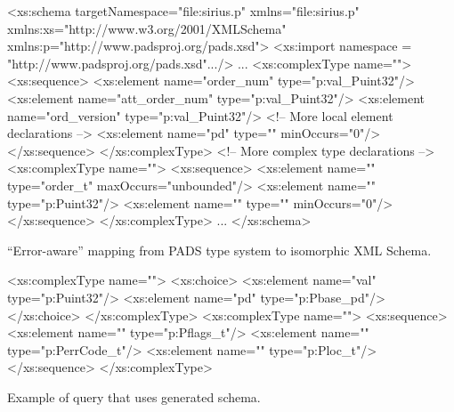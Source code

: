 \documentclass{sigplanconf}
\newcommand{\dibbler}{Sirius}
\begin{document}
\begin{figure*}
\begin{small}
\begin{code}
<xs:schema targetNamespace="file:sirius.p"
           xmlns="file:sirius.p"
           xmlns:xs="http://www.w3.org/2001/XMLSchema"
           xmlns:p="http://www.padsproj.org/pads.xsd">
<xs:import namespace = "http://www.padsproj.org/pads.xsd".../>
...
<xs:complexType name="">
 <xs:sequence>
  <xs:element name="order_num" type="p:val_Puint32"/>
  <xs:element name="att_order_num" type="p:val_Puint32"/>
  <xs:element name="ord_version" type="p:val_Puint32"/>
  <!-- More local element declarations -->
  <xs:element name="pd" type="" minOccurs="0"/>
 </xs:sequence>
</xs:complexType>
<!-- More complex type declarations -->
<xs:complexType name="">
 <xs:sequence>
  <xs:element name="" type="order_t" maxOccurs="unbounded"/>
  <xs:element name="" type="p:Puint32"/>
  <xs:element name="" type="" minOccurs="0"/>
 </xs:sequence>
</xs:complexType>
...
</xs:schema>
\end{code}
\end{small}
\caption{Fragment of XML Schema for \dibbler{} \pads{} description.}
\label{figure:dibbler-schema}
\end{figure*}

``Error-aware'' mapping from PADS type system to isomorphic XML
Schema. 
\begin{small}
\begin{code}
<xs:complexType name="">
  <xs:choice>
   <xs:element name="val" type="p:Puint32"/>
   <xs:element name="pd" type="p:Pbase_pd"/>
  </xs:choice>
</xs:complexType>
<xs:complexType name="">
 <xs:sequence>
   <xs:element name=""  type="p:Pflags_t"/>
   <xs:element name="" type="p:PerrCode_t"/>
   <xs:element name=""     type="p:Ploc_t"/>
 </xs:sequence>
</xs:complexType>
\end{code}
\end{small}

Example of query that uses generated schema.
\begin{small}
\end{small}
\end{document}
